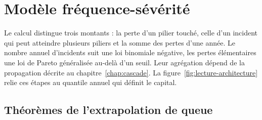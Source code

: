 ﻿%

\chapter{Modèle fréquence-sévérité}
\label{chap:socle}
\label{part:modele}

\noindent Le calcul distingue trois montants : la perte d'un pilier touché, celle d'un incident
qui peut atteindre plusieurs piliers et la somme des pertes d'une année. Le nombre annuel
d'incidents suit une loi binomiale négative, les pertes élémentaires une loi de Pareto généralisée
au-delà d'un seuil. Leur agrégation dépend de la propagation décrite au chapitre~\ref{chap:cascade}.
La figure~\ref{fig:lecture-architecture} relie ces étapes au quantile annuel qui définit le capital.





\section{Théorèmes de l'extrapolation de queue}

